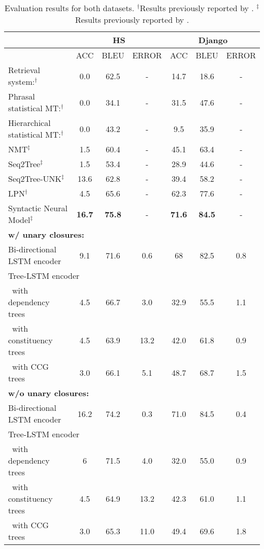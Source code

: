 \begin{table}[p]
\begin{tabular}{ l c c c c c c }

\hline
& \multicolumn{3}{c}{\textbf{HS}} & \multicolumn{3}{c}{\textbf{Django}}\\
\hline
& ACC & BLEU & ERROR & ACC & BLEU & ERROR \\
\hline
Retrieval system:$^\dagger$ & 0.0 & 62.5 & - & 14.7 & 18.6 & - \\
Phrasal statistical MT:$^\dagger$ & 0.0 & 34.1 & - & 31.5 & 47.6 & - \\
Hierarchical statistical MT:$^\dagger$ & 0.0 & 43.2 & - & 9.5 & 35.9 & - \\
\hline 
NMT$^\ddagger$ & 1.5 & 60.4 & - & 45.1 & 63.4 & - \\
Seq2Tree$^\ddagger$ & 1.5 & 53.4 & - & 28.9 & 44.6 & - \\
Seq2Tree-UNK$^\ddagger$ & 13.6 & 62.8 & - & 39.4 & 58.2 & - \\
LPN$^\dagger$ & 4.5 & 65.6 & - & 62.3 & 77.6 & - \\
Syntactic Neural Model$^\ddagger$ & \textbf{16.7} & \textbf{75.8} & - & \textbf{71.6} & \textbf{84.5} & - \\
\hline
\multicolumn{7}{l}{\textbf{w/ unary closures:}} \\
Bi-directional LSTM encoder & 9.1 & 71.6 & 0.6 & 68 & 82.5 & 0.8  \\
\multicolumn{7}{l}{Tree-LSTM encoder} \\
\ with dependency trees & 4.5 & 66.7 & 3.0 & 32.9 & 55.5 & 1.1 \\
\ with constituency trees & 4.5 & 63.9 & 13.2 & 42.0 & 61.8 & 0.9 \\
\ with CCG trees & 3.0 & 66.1 & 5.1 & 48.7 & 68.7 & 1.5 \\
\multicolumn{7}{l}{\textbf{w/o unary closures:}}\\
Bi-directional LSTM encoder & 16.2 & 74.2 & 0.3 & 71.0 & 84.5 & 0.4  \\
\multicolumn{7}{l}{Tree-LSTM encoder} \\
\ with dependency trees & 6 & 71.5 & 4.0 & 32.0 & 55.0 & 0.9 \\
\ with constituency trees & 4.5 & 64.9 & 13.2 & 42.3 & 61.0 & 1.1 \\
\ with CCG trees & 3.0 & 65.3 & 11.0 & 49.4 & 69.6 & 1.8 \\
\hline
\end{tabular}
\caption[Final results]{Evaluation results for both datasets. $^\dagger$Results previously reported by \cite{Ling2016}. $^\ddagger$Results previously reported by \cite{Yin2017}.}
\label{table:evaluation}
\end{table}




